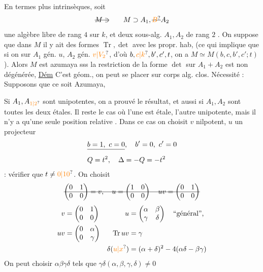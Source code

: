 En termes plus intrinsèques, soit
\[
\deleted{M\ni}\qquad M\supset A_1,\deleted{\unsure{B}} A_2
\]
une algèbre  libre de rang $4$ sur $k$,  et deux sous-alg. $A_1,A_2$  de rang $2$ . On suppose que  dans $M$ il y ait des formes $\operatorname{Tr},\det$ avec les propr. hab,  (ce qui implique que si on  sur $A_1$ gén. $u$, $A_2$ gén. $\unsure{v|V_2}$, d'où $b,\unsure{c|k},b',c',t$, on a $M\simeq M(b,c,b',c';t)$). Alors $M$ est azumaya sss la restriction de la forme  $\det$ sur $A_1+A_2$ est non dégénérée,
\uline{Dém} C'est géom., on peut se placer sur corps alg. clos. Nécessité : Supposons que ce soit Azumaya,  

Si $A_1,A_{\unsure{1|2}}$ sont unipotentes, on a prouvé le résultat, et aussi si $A_1,A_2$ sont toutes les deux étales. Il reste le cas où l'une est étale, l'autre unipotente, mais il n'y a qu'une seule position relative . Dans ce cas on choisit $v$ nilpotent, $u$ un projecteur
\[
\begin{aligned}
&\deleted{b=1,\ c=0},\quad b'=0,\ c'=0\\
&Q=t^2,\quad\Delta=-Q=-t^2
\end{aligned}
\]
: vérifier que $t\ne\unsure{0|10}$. On choisit
\[
\deleted{\begin{pmatrix}0&1\\0&0\end{pmatrix}=v,\quad u=\begin{pmatrix}1&0\\0&0\end{pmatrix}\quad uv=\begin{pmatrix}0&1\\0&0\end{pmatrix}}
\]
\[
\begin{aligned}
v&=\begin{pmatrix}0&1\\0&0\end{pmatrix}&u&=\begin{pmatrix}\alpha&\beta\\\gamma&\delta\end{pmatrix}\quad\text{``général'',}\\
uv&=\begin{pmatrix}0&\alpha\\0&\gamma\end{pmatrix}&\operatorname{Tr}uv&=\gamma\\
&&\delta(\unsure{u|x})&=(\alpha+\delta)^2-4(\alpha\delta-\beta\gamma)
\end{aligned}
\]
On peut choisir $\alpha\beta\gamma\delta$ tels que $\gamma\delta(\alpha,\beta,\gamma,\delta)\ne0$

